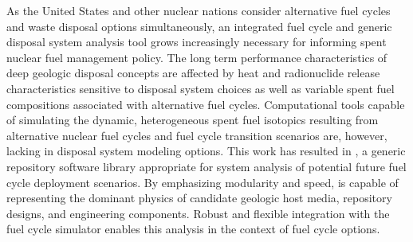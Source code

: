 As the United States and other nuclear nations consider alternative fuel cycles 
and waste disposal options simultaneously, an integrated fuel cycle and generic disposal system 
analysis tool grows increasingly necessary for informing spent nuclear 
fuel management policy. The long term performance characteristics of deep 
geologic disposal concepts are affected by heat and radionuclide release 
characteristics sensitive to disposal system choices as well as variable spent 
fuel compositions associated  with alternative fuel cycles.  Computational 
tools capable of simulating the dynamic, heterogeneous spent fuel isotopics 
resulting from alternative nuclear fuel cycles and fuel cycle transition 
scenarios are, however, 
lacking in disposal system modeling options.  This work has resulted in \Cyder, a 
generic repository software library appropriate for
system analysis of potential future fuel cycle deployment scenarios.  By emphasizing 
modularity and speed, \Cyder is capable of representing the dominant 
physics of candidate geologic host media, repository designs, and engineering components. 
Robust and flexible integration with the \Cyclus fuel cycle simulator
enables this analysis in the context of fuel cycle options.  

\glsresetall
